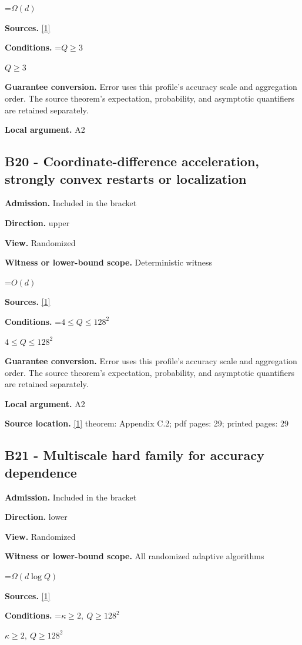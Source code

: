 \documentclass[10pt,a4paper]{article}
\newcommand{\AtlasMath}[1]{\par\begingroup\centering\setbox0=\hbox{$\displaystyle #1$}\ifdim\wd0>1.4\linewidth\typeout{ATLAS WIDE FORMULA: \the\wd0}\fi\ifdim\wd0>\linewidth\resizebox{\linewidth}{!}{\box0}\else\box0\fi\par\endgroup}
\newcommand{\AtlasInlineMath}[1]{\begingroup\setbox0=\hbox{$#1$}\ifdim\wd0>.4\linewidth\endgroup\AtlasMath{#1}\else\endgroup$#1$\fi}
\begin{document}
\AtlasMath{\Omega(d)}
\textbf{Sources.} \href{https://arxiv.org/html/2610.00345v1}{[1]}

\textbf{Conditions.} \AtlasInlineMath{Q\ge3}

\textbf{Guarantee conversion.} Error uses this profile's accuracy scale and aggregation order. The source theorem's expectation, probability, and asymptotic quantifiers are retained separately.

\textbf{Local argument.} A2

\subsection{B20 - Coordinate-difference acceleration, strongly convex restarts or localization}
\textbf{Admission.} Included in the bracket

\textbf{Direction.} upper

\textbf{View.} Randomized

\textbf{Witness or lower-bound scope.} Deterministic witness

\AtlasMath{O(d)}
\textbf{Sources.} \href{https://arxiv.org/html/2610.00345v1}{[1]}

\textbf{Conditions.} \AtlasInlineMath{4\le Q\le128^2}

\textbf{Guarantee conversion.} Error uses this profile's accuracy scale and aggregation order. The source theorem's expectation, probability, and asymptotic quantifiers are retained separately.

\textbf{Local argument.} A2

\textbf{Source location.} \href{https://arxiv.org/html/2610.00345v1}{[1]} theorem: Appendix C.2; pdf pages: 29; printed pages: 29

\subsection{B21 - Multiscale hard family for accuracy dependence}
\textbf{Admission.} Included in the bracket

\textbf{Direction.} lower

\textbf{View.} Randomized

\textbf{Witness or lower-bound scope.} All randomized adaptive algorithms

\AtlasMath{\Omega(d\log Q)}
\textbf{Sources.} \href{https://arxiv.org/html/2610.00345v1}{[1]}

\textbf{Conditions.} \AtlasInlineMath{\kappa\ge2,\ Q\ge128^2}
\end{document}
